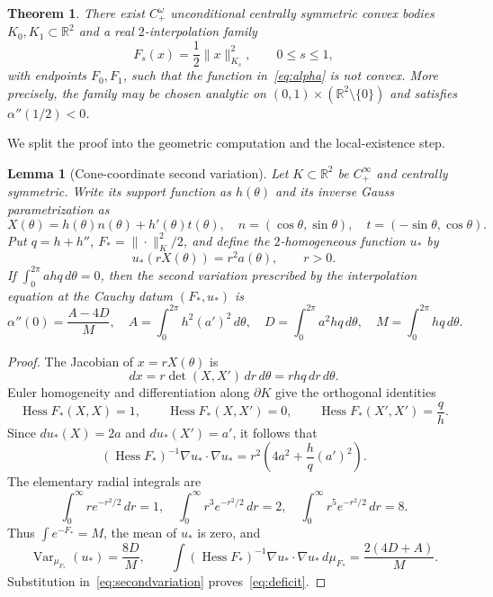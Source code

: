 \documentclass[11pt]{article}
\newtheorem{theorem}{Theorem}
\newtheorem{lemma}{Lemma}
\newcommand{\R}{\mathbb R}
\newcommand{\Hess}{\operatorname{Hess}}
\newcommand{\Var}{\operatorname{Var}}
\begin{document}
\begin{theorem}\label{thm:main}
There exist $C^\omega_+$ unconditional centrally symmetric convex bodies
$K_0,K_1\subset\R^2$ and a real $2$-interpolation family
\[
 F_s(x)=\frac12\|x\|_{K_s}^2,\qquad 0\leq s\leq1,
\]
with endpoints $F_0,F_1$, such that the function in~\eqref{eq:alpha} is not
convex.  More precisely, the family may be chosen analytic on
$(0,1)\times(\R^2\setminus\{0\})$ and satisfies
$\alpha''(1/2)<0$.
\end{theorem}

We split the proof into the geometric computation and the local-existence
step.

\begin{lemma}[Cone-coordinate second variation]\label{lem:cone}
Let $K\subset\R^2$ be $C^\infty_+$ and centrally symmetric.  Write its
support function as $h(\theta)$ and its inverse Gauss parametrization as
\[
 X(\theta)=h(\theta)n(\theta)+h'(\theta)t(\theta),
 \quad n=(\cos\theta,\sin\theta),\quad
 t=(-\sin\theta,\cos\theta).
\]
Put $q=h+h''$, $F_*=\|\cdot\|_K^2/2$, and define the $2$-homogeneous
function $u_*$ by
\[
 u_*(rX(\theta))=r^2a(\theta),\qquad r>0.
\]
If $\int_0^{2\pi}a hq\,d\theta=0$, then the second variation prescribed by
the interpolation equation at the Cauchy datum $(F_*,u_*)$ is
\begin{equation}\label{eq:deficit}
 \alpha''(0)=\frac{A-4D}{M},
 \quad
 A=\int_0^{2\pi}h^2(a')^2\,d\theta,
 \quad D=\int_0^{2\pi}a^2hq\,d\theta,
 \quad M=\int_0^{2\pi}hq\,d\theta.
\end{equation}
\end{lemma}

\begin{proof}
The Jacobian of $x=rX(\theta)$ is
\[
 dx=r\det(X,X')\,dr\,d\theta=rh q\,dr\,d\theta.
\]
Euler homogeneity and differentiation along $\partial K$ give the orthogonal
identities
\[
 \Hess F_*(X,X)=1,\qquad \Hess F_*(X,X')=0,\qquad
 \Hess F_*(X',X')=\frac qh.
\]
Since $du_*(X)=2a$ and $du_*(X')=a'$, it follows that
\begin{equation}\label{eq:pointenergy}
 (\Hess F_*)^{-1}\nabla u_*\cdot\nabla u_*
 =r^2\left(4a^2+\frac hq(a')^2\right).
\end{equation}
The elementary radial integrals are
\[
 \int_0^\infty r e^{-r^2/2}\,dr=1,\quad
 \int_0^\infty r^3e^{-r^2/2}\,dr=2,\quad
 \int_0^\infty r^5e^{-r^2/2}\,dr=8.
\]
Thus $\int e^{-F_*}=M$, the mean of $u_*$ is zero, and
\[
 \Var_{\mu_{F_*}}(u_*)=\frac{8D}{M},\qquad
 \int(\Hess F_*)^{-1}\nabla u_*\cdot\nabla u_*\,d\mu_{F_*}
 =\frac{2(4D+A)}M.
\]
Substitution in~\eqref{eq:secondvariation} proves~\eqref{eq:deficit}.
\end{proof}
\end{document}

